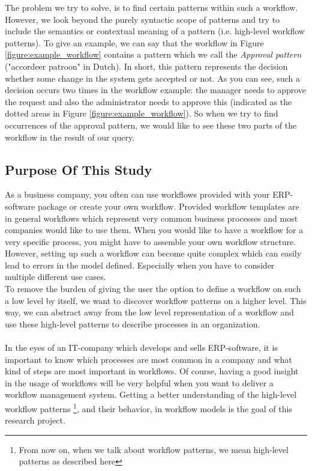 \documentclass[a4paper,11pt]{article}
\begin{document}
The problem we try to solve, is to find certain patterns within such a workflow. However, we look beyond the purely syntactic scope of patterns and try to include the semantics or contextual meaning of a pattern (i.e. high-level workflow patterns). To give an example, we can say that the workflow in Figure \ref{figure:example_workflow} contains a pattern which we call the \textit{Approval pattern} ("accordeer patroon" in Dutch). In short, this pattern represents the decision whether some change in the system gets accepted or not. As you can see, such a decision occurs two times in the workflow example: the manager needs to approve the request and also the administrator needs to approve this (indicated as the dotted areas in Figure \ref{figure:example_workflow}). So when we try to find occurrences of the approval pattern, we would like to see these two parts of the workflow in the result of our query.

\subsection{Purpose Of This Study}
As a business company, you often can use workflows provided with your ERP-software package or create your own workflow. Provided workflow templates are in general workflows which represent very common business processes and most companies would like to use them. When you would like to have a workflow for a very specific process, you might have to assemble your own workflow structure. However, setting up such a workflow can become quite complex which can easily lead to errors in the model defined. Especially when you have to consider multiple different use cases.\\
To remove the burden of giving the user the option to define a workflow on such a low level by itself, we want to discover workflow patterns on a higher level. This way, we can abstract away from the low level representation of a workflow and use these high-level patterns to describe processes in an organization.\\
\\
In the eyes of an IT-company which develops and sells ERP-software, it is important to know which processes are most common in a company and what kind of steps are most important in workflows. Of course, having a good insight in the usage of workflows will be very helpful when you want to deliver a workflow management system. Getting a better understanding of the high-level workflow patterns \footnote{From now on, when we talk about workflow patterns, we mean high-level patterns as described here}, and their behavior, in workflow models is the goal of this research project.
\end{document}

